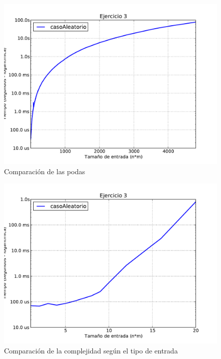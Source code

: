 \documentclass[11pt, a4paper, twoside]{article}
\begin{document}
\begin{figure}[H]
   \begin{center}
   \includegraphics[width=1\textwidth,angle=0]{../ej3/graficos/test_con_podas.pdf}
   \caption{Comparación de las podas}
   \label{fig:ej3-3}
   \end{center}
\end{figure}

\begin{figure}[H]
   \begin{center}
   \includegraphics[width=1\textwidth,angle=0]{../ej3/graficos/test_normal.pdf}
   \caption{Comparación de la complejidad según el tipo de entrada}
   \label{fig:ej3-4}
   \end{center}
\end{figure}

\end{document}
